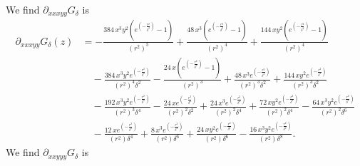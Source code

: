 \documentclass[12pt]{amsart}
\begin{document}
We find $\partial_{xxxyy}G_\delta$ is
\begin{align*}
  \partial_{xxxyy}G_\delta(z) &=
   -\frac{384 \, x^{3} y^{2} {\left(e^{\left(-\frac{r^{2}}{\delta^{2}}\right)} - 1\right)}}{{\left(r^{2}\right)}^{5}}
   + \frac{48 \, x^{3} {\left(e^{\left(-\frac{r^{2}}{\delta^{2}}\right)} - 1\right)}}{{\left(r^{2}\right)}^{4}} 
   + \frac{144 \, x y^{2} {\left(e^{\left(-\frac{r^{2}}{\delta^{2}}\right)} - 1\right)}}{{\left(r^{2}\right)}^{4}} \\
   &\quad - \frac{384 \, x^{3} y^{2} e^{\left(-\frac{r^{2}}{\delta^{2}}\right)}}{{\left(r^{2}\right)}^{4} \delta^{2}} 
   - \frac{24 \, x {\left(e^{\left(-\frac{r^{2}}{\delta^{2}}\right)} - 1\right)}}{{\left(r^{2}\right)}^{3}} 
   + \frac{48 \, x^{3} e^{\left(-\frac{r^{2}}{\delta^{2}}\right)}}{{\left(r^{2}\right)}^{3} \delta^{2}} 
   + \frac{144 \, x y^{2} e^{\left(-\frac{r^{2}}{\delta^{2}}\right)}}{{\left(r^{2}\right)}^{3} \delta^{2}} \\
   &\quad - \frac{192 \, x^{3} y^{2} e^{\left(-\frac{r^{2}}{\delta^{2}}\right)}}{{\left(r^{2}\right)}^{3} \delta^{4}} 
   - \frac{24 \, x e^{\left(-\frac{r^{2}}{\delta^{2}}\right)}}{{\left(r^{2}\right)}^{2} \delta^{2}} 
   + \frac{24 \, x^{3} e^{\left(-\frac{r^{2}}{\delta^{2}}\right)}}{{\left(r^{2}\right)}^{2} \delta^{4}} 
   + \frac{72 \, x y^{2} e^{\left(-\frac{r^{2}}{\delta^{2}}\right)}}{{\left(r^{2}\right)}^{2} \delta^{4}} 
   - \frac{64 \, x^{3} y^{2} e^{\left(-\frac{r^{2}}{\delta^{2}}\right)}}{{\left(r^{2}\right)}^{2} \delta^{6}} \\
   &\quad - \frac{12 \, x e^{\left(-\frac{r^{2}}{\delta^{2}}\right)}}{{\left(r^{2}\right)} \delta^{4}} 
   + \frac{8 \, x^{3} e^{\left(-\frac{r^{2}}{\delta^{2}}\right)}}{{\left(r^{2}\right)} \delta^{6}} 
   + \frac{24 \, x y^{2} e^{\left(-\frac{r^{2}}{\delta^{2}}\right)}}{{\left(r^{2}\right)} \delta^{6}} 
   - \frac{16 \, x^{3} y^{2} e^{\left(-\frac{r^{2}}{\delta^{2}}\right)}}{{\left(r^{2}\right)} \delta^{8}}.
\end{align*}
We find $\partial_{xxyyy}G_\delta$ is
\end{document}
